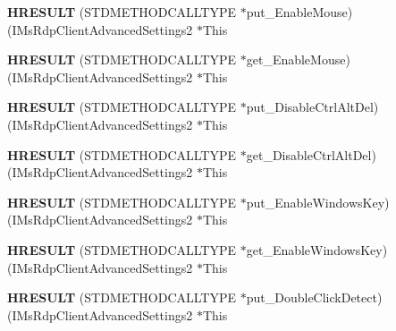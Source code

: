 \begin{DoxyCompactItemize}
{\bfseries H\+R\+E\+S\+U\+LT} (S\+T\+D\+M\+E\+T\+H\+O\+D\+C\+A\+L\+L\+T\+Y\+PE $\ast$put\+\_\+\+Enable\+Mouse)(I\+Ms\+Rdp\+Client\+Advanced\+Settings2 $\ast$This
\item 
\mbox{\label{struct_i_ms_rdp_client_advanced_settings2_vtbl_aec901396c4a5bb1f34bbfebd4c372e2f}} 
{\bfseries H\+R\+E\+S\+U\+LT} (S\+T\+D\+M\+E\+T\+H\+O\+D\+C\+A\+L\+L\+T\+Y\+PE $\ast$get\+\_\+\+Enable\+Mouse)(I\+Ms\+Rdp\+Client\+Advanced\+Settings2 $\ast$This
\item 
\mbox{\label{struct_i_ms_rdp_client_advanced_settings2_vtbl_a64b5f2569c72daf40755b3b54814c7a9}} 
{\bfseries H\+R\+E\+S\+U\+LT} (S\+T\+D\+M\+E\+T\+H\+O\+D\+C\+A\+L\+L\+T\+Y\+PE $\ast$put\+\_\+\+Disable\+Ctrl\+Alt\+Del)(I\+Ms\+Rdp\+Client\+Advanced\+Settings2 $\ast$This
\item 
\mbox{\label{struct_i_ms_rdp_client_advanced_settings2_vtbl_a40ebd54bc57d2d854bd9e394c4ebe3be}} 
{\bfseries H\+R\+E\+S\+U\+LT} (S\+T\+D\+M\+E\+T\+H\+O\+D\+C\+A\+L\+L\+T\+Y\+PE $\ast$get\+\_\+\+Disable\+Ctrl\+Alt\+Del)(I\+Ms\+Rdp\+Client\+Advanced\+Settings2 $\ast$This
\item 
\mbox{\label{struct_i_ms_rdp_client_advanced_settings2_vtbl_aa9c2a6899707e47bbf993dcf89819045}} 
{\bfseries H\+R\+E\+S\+U\+LT} (S\+T\+D\+M\+E\+T\+H\+O\+D\+C\+A\+L\+L\+T\+Y\+PE $\ast$put\+\_\+\+Enable\+Windows\+Key)(I\+Ms\+Rdp\+Client\+Advanced\+Settings2 $\ast$This
\item 
\mbox{\label{struct_i_ms_rdp_client_advanced_settings2_vtbl_a0acdb14cf51c4dfdcaa9ad806d879c19}} 
{\bfseries H\+R\+E\+S\+U\+LT} (S\+T\+D\+M\+E\+T\+H\+O\+D\+C\+A\+L\+L\+T\+Y\+PE $\ast$get\+\_\+\+Enable\+Windows\+Key)(I\+Ms\+Rdp\+Client\+Advanced\+Settings2 $\ast$This
\item 
\mbox{\label{struct_i_ms_rdp_client_advanced_settings2_vtbl_a1eb6f9a67d7b92de68c3c949cc553b64}} 
{\bfseries H\+R\+E\+S\+U\+LT} (S\+T\+D\+M\+E\+T\+H\+O\+D\+C\+A\+L\+L\+T\+Y\+PE $\ast$put\+\_\+\+Double\+Click\+Detect)(I\+Ms\+Rdp\+Client\+Advanced\+Settings2 $\ast$This

\end{DoxyCompactItemize}
